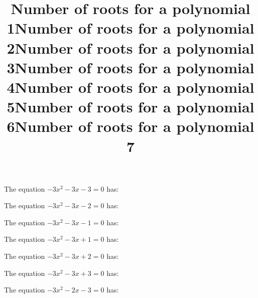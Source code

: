 \documentclass{article}
\begin{document}
\begin{category}
\begin{question}[multichoice]
\title{Number of roots for a polynomial 1}
The equation $- 3 x^{2} - 3 x - 3=0$ has:



\end{question}
\begin{question}[multichoice]
\title{Number of roots for a polynomial 2}
The equation $- 3 x^{2} - 3 x - 2=0$ has:



\end{question}
\begin{question}[multichoice]
\title{Number of roots for a polynomial 3}
The equation $- 3 x^{2} - 3 x - 1=0$ has:



\end{question}
\begin{question}[multichoice]
\title{Number of roots for a polynomial 4}
The equation $- 3 x^{2} - 3 x + 1=0$ has:



\end{question}
\begin{question}[multichoice]
\title{Number of roots for a polynomial 5}
The equation $- 3 x^{2} - 3 x + 2=0$ has:



\end{question}
\begin{question}[multichoice]
\title{Number of roots for a polynomial 6}
The equation $- 3 x^{2} - 3 x + 3=0$ has:



\end{question}
\begin{question}[multichoice]
\title{Number of roots for a polynomial 7}
The equation $- 3 x^{2} - 2 x - 3=0$ has:


\end{question}
\end{category}
\end{document}

